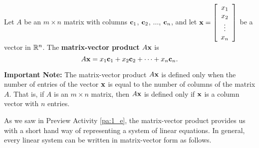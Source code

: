 \begin{definition} Let $A$ be an $m \times n$ matrix with columns $\mathbf{c}_1$, $\mathbf{c}_2$, $\ldots$, $\mathbf{c}_n$, and let $\mathbf{x} = \left[ \begin{array}{c} x_1 \\ x_2 \\ \vdots \\ x_n \end{array} \right]$ be a vector in $\mathbb{R}^n$. The \textbf{matrix-vector product} $A\mathbf{x}$ is
\[A \mathbf{x} = x_1 \mathbf{c}_1 + x_2 \mathbf{c}_2 + \cdots + x_n \mathbf{c}_n.\]
\end{definition}



\noindent \textbf{Important Note:} The matrix-vector product $A \mathbf{x}$ is defined only when the number of entries of the vector $\mathbf{x}$ is equal to the number of columns of the matrix $A$. That is, if $A$ is an $m \times n$ matrix, then $A\mathbf{x}$ is defined only if $\mathbf{x}$ is a column vector with $n$ entries. 



As we saw in Preview Activity \ref{pa:1_e}, the matrix-vector product provides us with a short hand way of representing a system of linear equations. In general, every linear system can be written in matrix-vector form as follows.

